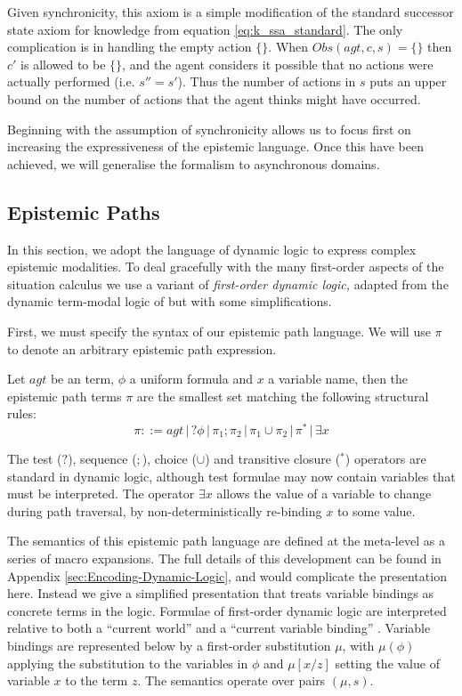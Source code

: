 Given synchronicity, this axiom is a simple modification of the standard
successor state axiom for knowledge from equation \eqref{eq:k_ssa_standard}.
The only complication is in handling the empty action $\{\}$. When
\textbf{$Obs(agt,c,s)=\{\}$} then $c'$ is allowed to be $\{\}$,
and the agent considers it possible that no actions were actually
performed (i.e. $s''=s'$). Thus the number of actions in $s$ puts
an upper bound on the number of actions that the agent thinks might
have occurred. 

Beginning with the assumption of synchronicity allows us to focus
first on increasing the expressiveness of the epistemic language.
Once this have been achieved, we will generalise the formalism to
asynchronous domains.\newpage{}


\subsection{Epistemic Paths\label{sub:Epistemic-Paths}}

In this section, we adopt the language of dynamic logic to express
complex epistemic modalities. To deal gracefully with the many first-order
aspects of the situation calculus we use a variant of \emph{first-order
dynamic logic,} adapted from the dynamic term-modal logic of \citet{kooi07dyn_termmodal_logic}
but with some simplifications.

First, we must specify the syntax of our epistemic path language.
We will use $\pi$ to denote an arbitrary epistemic path expression. 

\begin{defnL}
 Let $agt$ be an term, $\phi$ a
uniform formula and $x$ a variable name, then the epistemic path
terms $\pi$ are the smallest set matching the following structural
rules:\[
\pi::=agt\,|\,?\phi\,|\,\pi_{1};\pi_{2}\,|\,\pi_{1}\cup\pi_{2}\,|\,\pi^{*}\,|\,\exists x\]

\end{defnL}
\smallskip{}


The test ($?$), sequence ($;$), choice ($\cup$) and transitive
closure ($^{*}$) operators are standard in dynamic logic, although
test formulae may now contain variables that must be interpreted.
The operator $\exists x$ allows the value of a variable to change
during path traversal, by non-deterministically re-binding $x$ to
some value.

The semantics of this epistemic path language are defined at the meta-level
as a series of macro expansions. The full details of this development
can be found in Appendix \ref{sec:Encoding-Dynamic-Logic}, and would
complicate the presentation here. Instead we give a simplified presentation
that treats variable bindings as concrete terms in the logic. Formulae
of first-order dynamic logic are interpreted relative to both a {}``current
world'' and a {}``current variable binding'' \citep{kooi07dyn_termmodal_logic}.
Variable bindings are represented below by a first-order substitution
$\mu$, with $\mu(\phi)$ applying the substitution to the variables
in $\phi$ and $\mu[x/z]$ setting the value of variable $x$ to the
term $z$. The semantics operate over pairs $(\mu,s)$.

